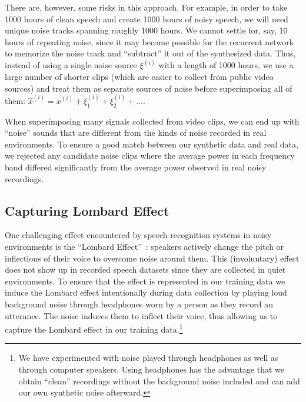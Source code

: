 There are, however, some risks in this approach. For example, in order to take
1000 hours of clean speech and create 1000 hours of noisy speech, we will need
unique noise tracks spanning roughly 1000 hours. We cannot settle for, say, 10
hours of repeating noise, since it may become possible for the recurrent
network to memorize the noise track and ``subtract'' it out of the synthesized
data. Thus, instead of using a single noise source $\xi^{(i)}$ with a length of
1000 hours, we use a large number of shorter clips (which are easier to collect
from public video sources) and treat them as separate sources of noise before
superimposing all of them: $\hat{x}^{(i)} = x^{(i)} + \xi_1^{(i)} +\xi_2^{(i)}
+ \ldots$.

When superimposing many signals collected from video clips, we can end up with
``noise'' sounds that are different from the kinds of noise recorded in real
environments. To ensure a good match between our synthetic data and real data,
we rejected any candidate noise clips where the average power in each frequency
band differed significantly from the average power observed in real noisy
recordings.

\subsection{Capturing Lombard Effect}
\label{sec:deepspeech:lombard}

One challenging effect encountered by speech recognition systems in noisy
environments is the ``Lombard Effect''~\cite{junqua1993lombard}: speakers
actively change the pitch or inflections of their voice to overcome noise
around them. This (involuntary) effect does not show up in recorded speech
datasets since they are collected in quiet environments. To ensure that the
effect is represented in our training data we induce the Lombard effect
intentionally during data collection by playing loud background noise through
headphones worn by a person as they record an utterance. The noise induces them
to inflect their voice, thus allowing us to capture the Lombard effect in our
training data.\footnote{We have experimented with noise played through
headphones as well as through computer speakers. Using headphones has the
advantage that we obtain ``clean'' recordings without the background noise
included and can add our own synthetic noise afterward.}

